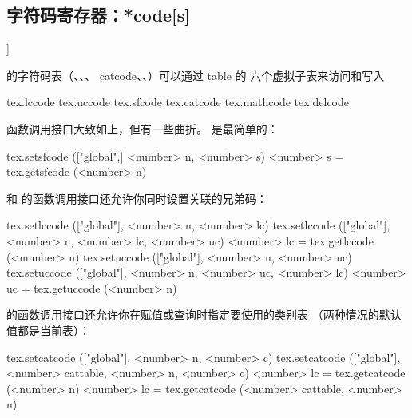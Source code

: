 \subsection{{字符码寄存器：\type {[get|set}*code[s]}}]


        
        
        
      
    
      

   
  

\TEX 的字符码表（、、、\prm
{catcode}、、）可以通过  table 的
六个虚拟子表来访问和写入

\startthreecolumns
\begin{typing}
tex.lccode
tex.uccode
tex.sfcode
tex.catcode
tex.mathcode
tex.delcode
\end{typing}
\stopthreecolumns

函数调用接口大致如上，但有一些曲折。 是最简单的：

\begin{typing}
tex.setsfcode (["global",] <number> n, <number> s)
<number> s = tex.getsfcode (<number> n)
\end{typing}

 和  的函数调用接口还允许你同时设置关联的兄弟码：

\begin{typing}
tex.setlccode (["global"], <number> n, <number> lc)
tex.setlccode (["global"], <number> n, <number> lc, <number> uc)
<number> lc = tex.getlccode (<number> n)
tex.setuccode (["global"], <number> n, <number> uc)
tex.setuccode (["global"], <number> n, <number> uc, <number> lc)
<number> uc = tex.getuccode (<number> n)
\end{typing}

 的函数调用接口还允许你在赋值或查询时指定要使用的类别表
（两种情况的默认值都是当前表）：

\begin{typing}
tex.setcatcode (["global"], <number> n, <number> c)
tex.setcatcode (["global"], <number> cattable, <number> n, <number> c)
<number> lc = tex.getcatcode (<number> n)
<number> lc = tex.getcatcode (<number> cattable, <number> n)
\end{typing}

